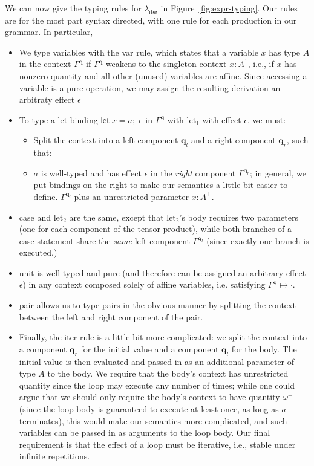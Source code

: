 \documentclass[acmsmall,screen,review]{acmart}
\newcommand{\mb}[1]{\ensuremath{\mathbf{#1}}}
\newcommand{\ms}[1]{\ensuremath{\mathsf{#1}}}
\newcommand{\letexpr}[3]{\ensuremath{\ms{let}\;#1 = #2;\;#3}}
\newcommand{\cwk}[2]{#1 \mapsto #2}
\newcommand{\brle}[1]{{\textsf{#1}}}
\newcommand{\subiterexp}{\texorpdfstring{\(\lambda_{\ms{iter}}\)}{lambda-iter}}
\newcommand{\oneq}{1}
\newcommand{\cpyq}{\omega^+}
\begin{document}
We can now give the typing rules for \subiterexp{} in Figure~\ref{fig:expr-typing}. Our rules
are for the most part syntax directed, with one rule for each production in our grammar. In
particular,
\begin{itemize}
  \item We type variables with the \brle{var} rule, which states that a variable $x$ has type $A$ in
  the context $\Gamma^{\mb{q}}$ if $\Gamma^{\mb{q}}$ weakens to the singleton context $x: A^\oneq$,
  i.e., if $x$ has nonzero quantity and all other (unused) variables are affine. Since accessing a
  variable is a pure operation, we may assign the resulting derivation an arbitraty effect
  $\epsilon$
  \item To type a let-binding $\letexpr{x}{a}{e}$ in $\Gamma^{\mb{q}}$ with \brle{let$_1$} with
  effect $\epsilon$, we must:
  \begin{itemize}
    \item Split the context into a left-component $\mb{q}_l$ and a right-component
    $\mb{q}_r$, such that:
    \item $a$ is well-typed and has effect $\epsilon$ in the \emph{right} component
    $\Gamma^{\mb{q}_r}$; in general, we put bindings on the right to make our semantics a little bit
    easier to define. $\Gamma^{\mb{q}_l}$ plus an unrestricted parameter $x: A^\top$.
  \end{itemize}
  \item \brle{case} and \brle{let$_2$} are the same, except that \brle{let$_2$}'s body requires two
  parameters (one for each component of the tensor product), while both branches of a case-statement
  share the \emph{same} left-component $\Gamma^{\mb{q}_l}$ (since exactly one branch is executed.)
  \item \brle{unit} is well-typed and pure (and therefore can be assigned an arbitrary effect
  $\epsilon$) in any context composed solely of affine variables, i.e. satisfying
  $\cwk{\Gamma^{\mb{q}}}{\cdot}$.
  \item \brle{pair} allows us to type pairs in the obvious manner by splitting the context between
  the left and right component of the pair.
  \item Finally, the \brle{iter} rule is a little bit more complicated: we split the context into a
  component $\mb{q}_r$ for the initial value and a component $\mb{q}_l$ for the body. The initial
  value is then evaluated and passed in as an additional parameter of type $A$ to the body. We
  require that the body's context has unrestricted quantity since the loop may execute any number of
  times; while one could argue that we should only require the body's context to have quantity
  $\cpyq$ (since the loop body is guaranteed to execute at least once, as long as $a$ terminates),
  this would make our semantics more complicated, and such variables can be passed in as arguments
  to the loop body. Our final requirement is that the effect of a loop must be iterative, i.e.,
  stable under infinite repetitions.
\end{itemize}
\end{document}
